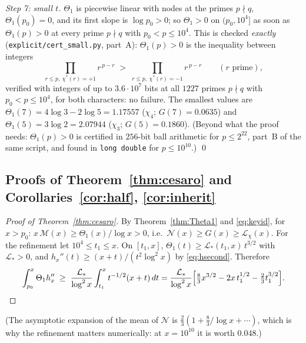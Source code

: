\documentclass[11pt]{amsart}
\theoremstyle{definition}
\numberwithin{equation}{section}
\newcommand{\cM}{\mathcal M}          %
\newcommand{\cN}{\mathcal N}          %
\newcommand{\cL}{\mathcal L}          %
\begin{document}
\emph{Step 7: small $t$.} $\Theta_1$ is piecewise linear with nodes
at the primes $p\nmid q$, $\Theta_1(p_0)=0$, and its first slope is
$\log p_0>0$; so $\Theta_1>0$ on $(p_0,10^4]$ as soon as
$\Theta_1(p)>0$ at every prime $p\nmid q$ with $p_0<p\le10^4$. This is
checked \emph{exactly} (\texttt{explicit/cert\_small.py}, part~A):
$\Theta_1(p)>0$ is the inequality between integers
\[
\prod_{r\le p,\ \chi^*(r)=+1}r^{\,p-r}\;>\;
\prod_{r\le p,\ \chi^*(r)=-1}r^{\,p-r}
\qquad(r\text{ prime}),
\]
verified with integers of up to $3.6\cdot10^7$ bits at all $1227$
primes $p\nmid q$ with $p_0<p\le10^4$, for both characters: no
failure. The smallest values are
$\Theta_1(7)=4\log3-2\log5=1.17557$ ($\chi_4$; $G(7)=0.0635$) and
$\Theta_1(5)=3\log2=2.07944$ ($\chi_3$; $G(5)=0.1860$). (Beyond what
the proof needs: $\Theta_1(p)>0$ is certified in $256$-bit ball
arithmetic for $p\le2^{22}$, part~B of the same script, and found in
\texttt{long double} for $p\le10^{10}$.) \qed

\subsection{Proofs of Theorem~\ref{thm:cesaro} and
Corollaries~\ref{cor:half}, \ref{cor:inherit}}

\begin{proof}[Proof of Theorem~\ref{thm:cesaro}]
By Theorem~\ref{thm:Theta1} and \eqref{eq:keyid}, for $x>p_0$:
$x\,\cM(x)\ge\Theta_1(x)/\log x>0$, i.e.\
$\cN(x)\ge G(x)\ge\cL_\chi(x)$. For the refinement let
$10^4\le t_1\le x$. On $[t_1,x]$,
$\Theta_1(t)\ge\cL_*(t_1,x)\,t^{3/2}$ with $\cL_*>0$, and
$h_x''(t)\ge(x+t)/(t^2\log^2x)$ by \eqref{eq:hsecond}. Therefore
\[
\int_{p_0}^x\Theta_1h_x''\;\ge\;\frac{\cL_*}{\log^2x}\int_{t_1}^x
t^{-1/2}(x+t)\,dt
=\frac{\cL_*}{\log^2x}\Bigl[\tfrac83x^{3/2}-2x\,t_1^{1/2}
-\tfrac23t_1^{3/2}\Bigr].\qedhere
\]
\end{proof}

(The asymptotic expansion of the mean of $\cN$ is
$\tfrac23(1+\tfrac83/\log x+\cdots)$, which is why the refinement
matters numerically: at $x=10^{10}$ it is worth $0.048$.)
\end{document}
